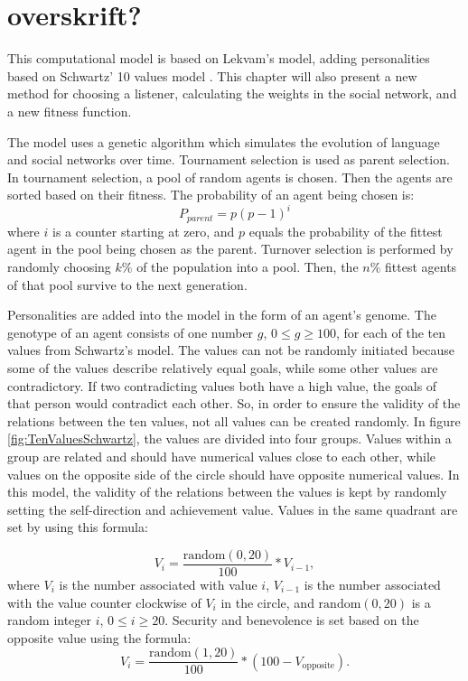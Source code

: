 \section{overskrift?}

This computational model is based on Lekvam’s model, adding personalities based on Schwartz' 10 values model \citep{lekvam2014co, schwartz2012overview}. This chapter will also present a new method for choosing a listener, calculating the weights in the social network, and a new fitness function.

The model uses a genetic algorithm which simulates the evolution of language and social networks over time. Tournament selection is used as parent selection. In tournament selection, a pool of random agents is chosen. Then the agents are sorted based on their fitness. The probability of an agent being chosen is:
\begin{equation}
    \label{eq:TSelect}
    P_{parent} = p(p-1)^{i}
\end{equation}
where $i$ is a counter starting at zero, and $p$ equals the probability of the fittest agent in the pool being chosen as the parent. Turnover selection is performed by randomly choosing $k\%$ of the population into a pool. Then, the $n\%$ fittest agents of that pool survive to the next generation. 

Personalities are added into the model in the form of an agent’s genome. The genotype of an agent consists of one number $g$, $0 \leq g \geq 100$, for each of the ten values from Schwartz’s model. The values can not be randomly initiated because some of the values describe relatively equal goals, while some other values are contradictory. If two contradicting values both have a high value, the goals of that person would contradict each other. So, in order to ensure the validity of the relations between the ten values, not all values can be created randomly. In figure \ref{fig:TenValuesSchwartz}, the values are divided into four groups. Values within a group are related and should have numerical values close to each other, while values on the opposite side of the circle should have opposite numerical values. In this model, the validity of the relations between the values is kept by randomly setting the self-direction and achievement value. Values in the same quadrant are set by using this formula:

\begin{equation}\label{eq:valuesInSameQuadrant}
V_{i} = \frac{\mathrm{random}(0, 20)}{100} \ast V_{i-1},
\end{equation}
where $V_{i}$ is the number associated with value $i$, $V_{i-1}$ is the number associated with the value counter clockwise of $V_i$ in the circle, and $\mathrm{random}(0, 20)$ is a random integer $i$, $0 \leq i \geq 20$. Security and benevolence is set based on the opposite value using the formula:
\begin{equation}\label{eq:valuesInOppositeQuadrant}
V_{i} = \frac{\mathrm{random}(1, 20)}{100} \ast (100 - V_{\mathrm{opposite}}).
\end{equation}


